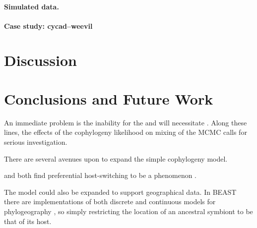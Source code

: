 \documentclass[12pt,letterpaper]{article}
\begin{document}
\paragraph*{Simulated data.}

\paragraph*{Case study: cycad--weevil}

\section*{Discussion}

\section*{Conclusions and Future Work}

An immediate problem is the inability for the and will necessitate . Along these lines, the effects of the cophylogeny likelihood on mixing of the \ac{MCMC} calls for serious investigation. 

There are several avenues upon to expand the simple cophylogeny model. 

\textcite{Charleston:2002} and \textcite{Faria:2013} both find preferential host-switching to be a phenomenon . 

The model could also be expanded to support geographical data. In BEAST there are implementations of both discrete and continuous models for phylogeography \parencites{Lemey:2009}{Lemey:2010}, so simply restricting the location of an ancestral symbiont to be that of its host.

\printbibliography
\end{document}
